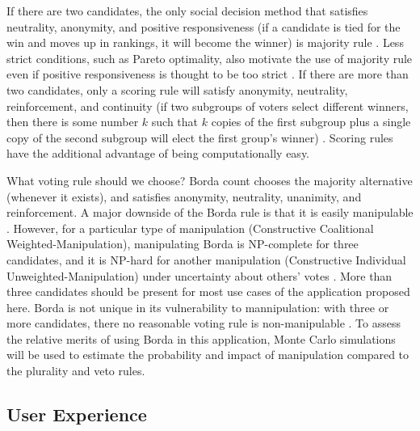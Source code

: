 \documentclass[12pt,letterpaper]{article} %
\begin{document}
If there are two candidates, the only social decision method that satisfies neutrality, anonymity, and positive responsiveness (if a candidate is tied for the win and moves up in rankings, it will become the winner) is majority rule \citep{may1952}. Less strict conditions, such as Pareto optimality, also motivate the use of majority rule even if positive responsiveness is thought to be too strict \citep{acsan2002,j2003majority}. If there are more than two candidates, only a scoring rule will satisfy anonymity, neutrality, reinforcement, and continuity (if two subgroups of voters select different winners, then there is some number $k$ such that $k$ copies of the first subgroup plus a single copy of the second subgroup will elect the first group's winner) \citep{young1975}. Scoring rules have the additional advantage of being computationally easy.

What voting rule should we choose? Borda count chooses the majority alternative (whenever it exists), and satisfies anonymity, neutrality, unanimity, and reinforcement. A major downside of the Borda rule is that it is easily manipulable \citep{bartholdi1989computational}. However, for a particular type of manipulation (Constructive Coalitional Weighted-Manipulation), manipulating Borda is NP-complete for three candidates, and it is NP-hard for another manipulation (Constructive Individual Unweighted-Manipulation) under uncertainty about others' votes \citep{conitzer2007elections}. More than three candidates should be present for most use cases of the application proposed here. Borda is not unique in its vulnerability to mannipulation: with three or more candidates, there no reasonable voting rule is non-manipulable \citep{gibbard1973manipulation,satterthwaite1975strategy,xia2009complexity}. To assess the relative merits of using Borda in this application, Monte Carlo simulations will be used to estimate the probability and impact of manipulation compared to the plurality and veto rules.


\subsection{User Experience}
\end{document}
